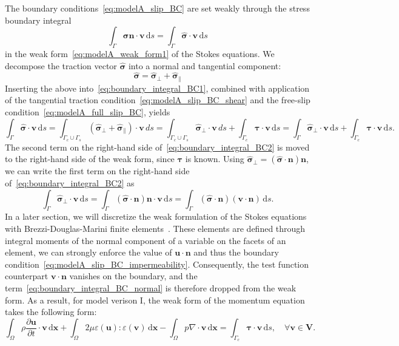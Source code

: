 \documentclass[fleqn]{wlscirep}
\newcommand{\pdifft}[1]{\frac{\partial  #1}{\partial t}}
\newcommand{\intO}[1]{\int_{\Omega}#1 \, \mathrm d\bm{x}}
\newcommand{\intG}[1]{\int_{\Gamma}#1 \, \mathrm ds}
\newcommand{\intGc}[1]{\int_{\Gamma_c}#1 \, \mathrm ds}
\newcommand{\Gs}{\Gamma_{s}}
\newcommand{\Gc}{\Gamma_{c}}
\newcommand{\nn}{\mathbf{n}}
\newcommand{\uu}{\mathbf{u}}
\newcommand{\vv}{\mathbf{v}}
\newcommand{\VV}{\mathbf{V}}
\newcommand{\bsig}{\bm{\sigma}}
\newcommand{\bsigpar}{\hat{\bsig}_{\parallel}}
\newcommand{\bsigperp}{\hat{\bsig}_{\perp}}
\newcommand{\btau}{\bm{\tau}}
\begin{document}
The boundary conditions~\eqref{eq:modelA_slip_BC} are set weakly through the stress boundary integral 
\begin{equation}
    \intG{\bsig\nn\cdot\vv} =  \intG{\hat{\bsig}\cdot\vv}
    \label{eq:boundary_integral_BC1}
\end{equation}
in the weak form~\eqref{eq:modelA_weak_form1} of the Stokes equations. We decompose the traction vector $\hat{\bsig}$ into a normal and tangential component:
\begin{equation*}
    \hat{\bsig} = \bsigperp + \bsigpar
\end{equation*}
Inserting the above into~\eqref{eq:boundary_integral_BC1}, combined with application of the tangential traction condition~\eqref{eq:modelA_slip_BC_shear} and the free-slip condition~\eqref{eq:modelA_full_slip_BC}, yields
\begin{equation}
    \intG{\hat{\bsig}\cdot\vv} = \int_{\Gc\cup\Gs}{(\bsigperp + \bsigpar)\cdot\vv}\, ds = 
    \int_{\Gc\cup\Gs}{\bsigperp\cdot\vv}\, ds + \intGc{\btau\cdot\vv} = \intG{\bsigperp\cdot\vv} + \intGc{\btau\cdot\vv}.
    \label{eq:boundary_integral_BC2}
\end{equation}
The second term on the right-hand side of~\eqref{eq:boundary_integral_BC2} is moved to the right-hand side of the weak form, since $\btau$ is known. Using $\hat{\bsig}_{\perp} = (\hat{\bsig}\cdot\nn)\nn$, we can write the first term on the right-hand side of~\eqref{eq:boundary_integral_BC2} as
\begin{equation}
    \intG{\bsigperp\cdot\vv} = \intG{(\hat{\bsig}\cdot\nn)\nn\cdot\vv} = \intG{(\hat{\bsig}\cdot\nn)(\vv\cdot\nn)}.
    \label{eq:boundary_integral_BC_normal}
\end{equation}
In a later section, we will discretize the weak formulation of the Stokes equations with Brezzi-Douglas-Marini finite elements~\cite{Brezzi1985TwoProblems}. These elements are defined through integral moments of the normal component of a variable on the facets of an element, we can strongly enforce the value of $\uu\cdot\nn$ and thus the boundary condition~\eqref{eq:modelA_slip_BC_impermeability}. Consequently, the test function counterpart $\vv\cdot\nn$ vanishes on the boundary, and the term~\eqref{eq:boundary_integral_BC_normal} is therefore dropped from the weak form. As a result, for model verison I, the weak form of the momentum equation takes the following form:
\begin{equation*}
    \intO{\rho\pdifft{\uu}\cdot\vv} + \intO{2\mu\varepsilon(\uu) : \varepsilon(\vv)} - \intO{p\nabla\cdot\vv} = \intGc{\btau\cdot\vv}, \quad\forall\vv\in\VV.
\end{equation*}
\end{document}
